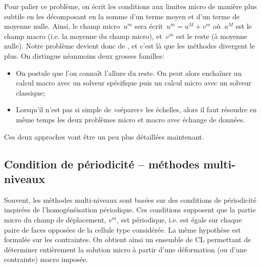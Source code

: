 
Pour palier ce problème, on écrit les conditions aux limites micro de manière plus subtile en les décomposant en la somme d'un terme moyen et d'un terme de moyenne nulle. Ainsi, le champ micro~$u^m$ sera écrit~$u^m=u^M +v^m$ où~$u^M$ est le champ macro (i.e. la moyenne du champ micro), et~$v^m$ est le reste (à moyenne nulle).
Notre problème devient donc de , et c'est là que les méthodes divergent le plus. On distingue néanmoins deux grosses familles:
\begin{itemize}
  \item {}

	On postule que l'on connaît l'allure du reste. On peut alors enchaîner un calcul macro
	avec un solveur spécifique puis un calcul micro avec un solveur classique;
  \item {}

	Lorsqu'il n'est pas si simple de «séparer» les échelles, alors il faut résoudre 
	en même temps les deux problèmes micro et macro avec échange de données.
\end{itemize}
Ces deux approches vont être un peu plus détaillées maintenant.




\medskip
\subsection{Condition de périodicité -- méthodes multi-niveaux}

Souvent, les méthodes multi-niveaux sont basées sur des conditions de périodicité inspirées de l'homogénéisation périodique. Ces conditions supposent que la partie micro du champ de déplacement, $v^m$, est périodique, i.e. est égale sur chaque paire de faces opposées de la cellule type considérée. La même hypothèse est formulée sur les contraintes. On obtient ainsi un ensemble de CL permettant de déterminer entièrement la solution micro à partir d'une déformation (ou d'une contrainte) macro imposée.

